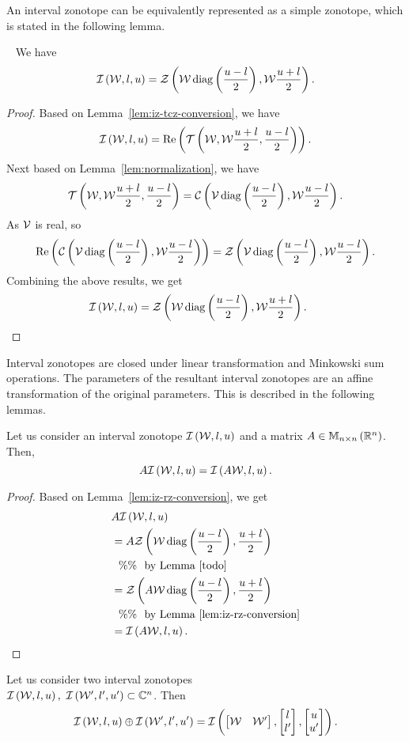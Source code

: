 %
An interval zonotope can be equivalently represented as a simple
zonotope, which is stated in the following lemma.
%
\begin{lemma}~\label{lem:iz-rz-conversion}
We have
%
\[
\mathit{\operatorname{\mathcal{I}}}\left(\mathcal{W},l,u\right)=\mathit{\mathcal{Z}}\left(\mathcal{W}\operatorname{diag}\left(\frac{u-l}{2}\right),\mathcal{W}\frac{u+l}{2}\right).
\]
%
\end{lemma}
%
\begin{proof}
Based on Lemma~\ref{lem:iz-tcz-conversion}, we have 
%
\[
\mathit{\operatorname{\mathcal{I}}}\left(\mathcal{W},l,u\right)=\operatorname{Re}\left(\mathit{\operatorname{\mathcal{T}}}\left(\mathcal{W},\mathcal{W}\frac{u+l}{2},\frac{u-l}{2}\right)\right).
\]
%
Next based on Lemma~\ref{lem:normalization}, we have 
%
\[
\mathit{\operatorname{\mathcal{T}}}\left(\mathcal{W},\mathcal{W}\frac{u+l}{2},\frac{u-l}{2}\right)=\mathit{\mathcal{C}}\left(\mathcal{V}\operatorname{diag}\left(\frac{u-l}{2}\right),\mathcal{W}\frac{u-l}{2}\right).
\]
%
As $\mathcal{V}$ is real, so
%
\[
\operatorname{Re}\left(\mathit{\mathcal{C}}\left(\mathcal{V}\operatorname{diag}\left(\frac{u-l}{2}\right),\mathcal{W}\frac{u-l}{2}\right)\right)=\mathit{\mathcal{Z}}\left(\mathcal{V}\operatorname{diag}\left(\frac{u-l}{2}\right),\mathcal{W}\frac{u-l}{2}\right).
\]
%
Combining the above results, we get
\[
\mathit{\operatorname{\mathcal{I}}}\left(\mathcal{W},l,u\right)=\mathit{\mathcal{Z}}\left(\mathcal{W}\operatorname{diag}\left(\frac{u-l}{2}\right),\mathcal{W}\frac{u+l}{2}\right).~~~~\qedhere
\]
%
\end{proof}
%
Interval zonotopes are closed under linear transformation and
Minkowski sum operations.  The parameters of the resultant interval
zonotopes are an affine transformation of the original parameters.
This is described in the following lemmas.
%
\begin{lemma}
Let us consider an interval zonotope $\mathit{\operatorname{\mathcal{I}}}\left(\mathcal{W},l,u\right)$ and a
matrix $A\in\mathbb{M}_{n\times n}\left(\mathbb{R}^n\right)$.  Then,
%
\[
A\mathit{\operatorname{\mathcal{I}}}\left(\mathcal{W},l,u\right)=\mathit{\operatorname{\mathcal{I}}}\left(A\mathcal{W},l,u\right).
\]
%
\end{lemma}
%
\begin{proof}
Based on Lemma~\ref{lem:iz-rz-conversion}, we get
%
\begin{align*}
&  A\mathit{\operatorname{\mathcal{I}}}\left(\mathcal{W},l,u\right)\\
  & =
  A\mathit{\mathcal{Z}}\left(\mathcal{W}\operatorname{diag}\left(\frac{u-l}{2}\right),\frac{u+l}{2}\right)\\
  & ~~\%\%~~\text{by Lemma~\ref{todo}}\\
  & = \mathit{\mathcal{Z}}\left(A\mathcal{W}\operatorname{diag}\left(\frac{u-l}{2}\right),\frac{u+l}{2}\right)\\
  & ~~\%\%~~\text{by Lemma~\ref{lem:iz-rz-conversion}}\\
  & = \mathit{\operatorname{\mathcal{I}}}\left(A\mathcal{W},l,u\right).~~~~~\qedhere
\end{align*}
%
\end{proof}
%
\begin{lemma}
  Let us consider two interval zonotopes\\
  $\mathit{\operatorname{\mathcal{I}}}\left(\mathcal{W},l,u\right),~\mathit{\operatorname{\mathcal{I}}}\left(\mathcal{W}^\prime,l^\prime,u^\prime\right)\subset\mathbb{C}^n$.
  Then 
%
\[
\mathit{\operatorname{\mathcal{I}}}\left(\mathcal{W},l,u\right)\oplus \mathit{\operatorname{\mathcal{I}}}\left(\mathcal{W}^\prime,l^\prime,u^\prime\right)
= \mathit{\operatorname{\mathcal{I}}}\left(\left[\begin{matrix}\mathcal{W} &
    \mathcal{W}^\prime\end{matrix}\right],\left[\begin{matrix}l\\l^\prime\end{matrix}\right],\left[\begin{matrix}u\\u^\prime\end{matrix}\right]\right). 
\]
%
\end{lemma}
